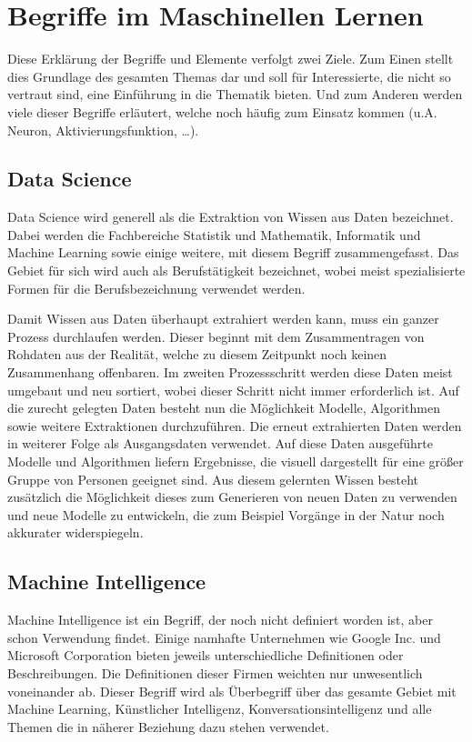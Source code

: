 \chapter{Begriffe im Maschinellen Lernen}
\label{cha:Begriffe}

Diese Erklärung der Begriffe und Elemente verfolgt zwei Ziele.
Zum Einen stellt dies Grundlage des gesamten Themas dar und soll für Interessierte, die nicht so vertraut sind, eine Einführung in die Thematik bieten. 
Und zum Anderen werden viele dieser Begriffe erläutert, welche noch häufig zum Einsatz kommen (u.A. Neuron, Aktivierungsfunktion, …).

\section{Data Science}

Data Science wird generell als die Extraktion von Wissen aus Daten bezeichnet. 
Dabei werden die Fachbereiche Statistik und Mathematik, Informatik und Machine Learning sowie einige weitere, mit diesem Begriff zusammengefasst. 
Das Gebiet für sich wird auch als Berufstätigkeit bezeichnet, wobei meist spezialisierte Formen für die Berufsbezeichnung verwendet werden. \newline

\noindent 
Damit Wissen aus Daten überhaupt extrahiert werden kann, muss ein ganzer Prozess durchlaufen werden. 
Dieser beginnt mit dem Zusammentragen von Rohdaten aus der Realität, welche zu diesem Zeitpunkt noch keinen Zusammenhang offenbaren. 
Im zweiten Prozessschritt werden diese Daten meist umgebaut und neu sortiert, wobei dieser Schritt nicht immer erforderlich ist. 
Auf die zurecht gelegten Daten besteht nun die Möglichkeit Modelle, Algorithmen sowie weitere Extraktionen durchzuführen. 
Die erneut extrahierten Daten werden in weiterer Folge als Ausgangsdaten verwendet. 
Auf diese Daten ausgeführte Modelle und Algorithmen liefern Ergebnisse, die visuell dargestellt für eine größer Gruppe von Personen geeignet sind. 
Aus diesem gelernten Wissen besteht zusätzlich die Möglichkeit dieses zum Generieren von neuen Daten zu verwenden und neue Modelle zu entwickeln, die zum Beispiel Vorgänge in der Natur noch akkurater widerspiegeln.

\section{Machine Intelligence}

Machine Intelligence ist ein Begriff, der noch nicht definiert worden ist, aber schon Verwendung findet. 
Einige namhafte Unternehmen wie Google Inc. und Microsoft Corporation bieten jeweils unterschiedliche Definitionen oder Beschreibungen. 
Die Definitionen dieser Firmen weichten nur unwesentlich voneinander ab.
Dieser Begriff wird als Überbegriff über das gesamte Gebiet mit Machine Learning, Künstlicher Intelligenz, Konversationsintelligenz und alle Themen die in näherer Beziehung dazu stehen verwendet. 

